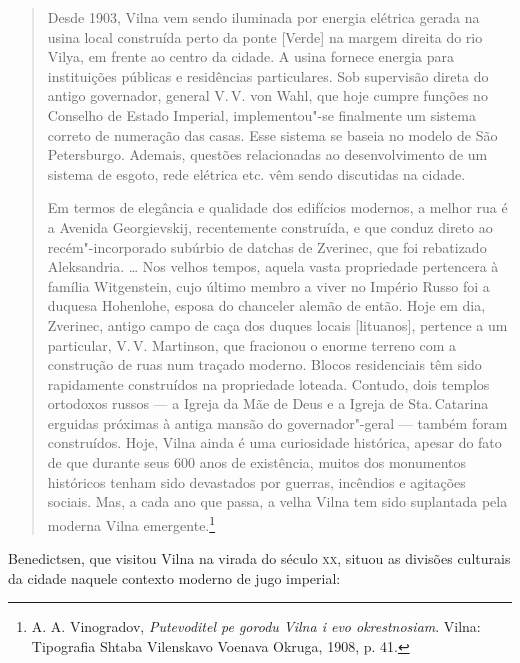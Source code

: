 \begin{quote}
Desde 1903, Vilna vem sendo iluminada por energia elétrica gerada na
usina local construída perto da ponte {[}Verde{]} na margem direita do
rio Vilya, em frente ao centro da cidade. A usina fornece energia para
instituições públicas e residências particulares. Sob supervisão direta
do antigo governador, general V.\,V. von Wahl, que hoje cumpre funções no
Conselho de Estado Imperial, implementou"-se finalmente um sistema
correto de numeração das casas. Esse sistema se baseia no modelo de São
Petersburgo. Ademais, questões relacionadas ao desenvolvimento de um
sistema de esgoto, rede elétrica etc. vêm sendo discutidas na cidade.

Em termos de elegância e qualidade dos edifícios modernos, a melhor rua
é a Avenida Georgievskij, recentemente construída, e que conduz direto
ao recém"-incorporado subúrbio de datchas de Zverinec, que foi rebatizado
Aleksandria. \ldots{} Nos velhos tempos, aquela vasta propriedade
pertencera à família Witgenstein, cujo último membro a viver no Império
Russo foi a duquesa Hohenlohe, esposa do chanceler alemão de então. Hoje
em dia, Zverinec, antigo campo de caça dos duques locais {[}lituanos{]},
pertence a um particular, V.\,V. Martinson, que fracionou o enorme
terreno com a construção de ruas num traçado moderno. Blocos
residenciais têm sido rapidamente construídos na propriedade loteada.
Contudo, dois templos ortodoxos russos --- a Igreja da Mãe de Deus e a
Igreja de Sta.\,Catarina erguidas próximas à antiga mansão do
governador"-geral --- também foram construídos. Hoje, Vilna ainda é uma
curiosidade histórica, apesar do fato de que durante seus 600 anos de
existência, muitos dos monumentos históricos tenham sido devastados por
guerras, incêndios e agitações sociais. Mas, a cada ano que passa, a
velha Vilna tem sido suplantada pela moderna Vilna emergente.\footnote{A. A. Vinogradov, \textit{Putevoditel pe gorodu Vilna i evo okrestnosiam}. Vilna: Tipografia Shtaba Vilenskavo Voenava Okruga, 1908, p. 41.} 
\end{quote}

%

Benedictsen, que visitou Vilna na virada do século \textsc{xx}, situou as
divisões culturais da cidade naquele contexto moderno de jugo imperial:

